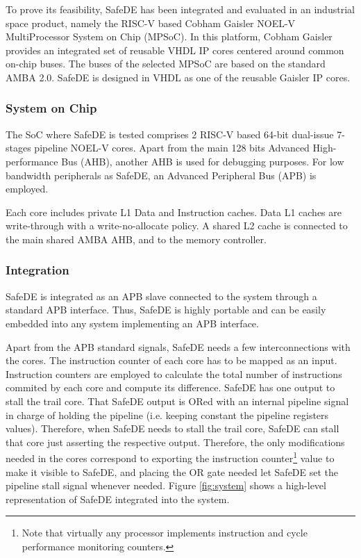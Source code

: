 To prove its feasibility, SafeDE has been integrated and evaluated in an industrial space product, namely the RISC-V based Cobham Gaisler NOEL-V MultiProcessor System on Chip (MPSoC). In this platform, Cobham Gaisler provides an integrated set of reusable VHDL IP cores centered around common on-chip buses. The buses of the selected MPSoC are based on the standard AMBA 2.0. SafeDE is designed in VHDL as one of the reusable Gaisler IP cores. 

\subsubsection{System on Chip}
The SoC where SafeDE is tested comprises 2 RISC-V based 64-bit dual-issue 7-stages pipeline NOEL-V cores. Apart from the main 128 bits Advanced High-performance Bus (AHB), another AHB is used for debugging purposes. For low bandwidth peripherals as SafeDE, an Advanced Peripheral Bus (APB) is employed.

Each core includes private L1 Data and Instruction caches. Data L1 caches are write-through with a write-no-allocate policy. A shared L2 cache is connected to the main shared AMBA AHB, and to the memory controller. 


\subsubsection{Integration}
SafeDE is integrated as an APB slave connected to the system through a standard APB interface. Thus, SafeDE is highly portable and can be easily embedded into any system implementing an APB interface.

Apart from the APB standard signals, SafeDE needs a few interconnections with the cores. The instruction counter of each core has to be mapped as an input. Instruction counters are employed to calculate the total number of instructions commited by each core and compute its difference. SafeDE has one output to stall the trail core. That SafeDE output is ORed with an internal pipeline signal in charge of holding the pipeline (i.e. keeping constant the pipeline registers values). Therefore, when SafeDE needs to stall the trail core, SafeDE can stall that core just asserting the respective output. 
Therefore, the only modifications needed in the cores correspond to exporting the instruction counter\footnote{Note that virtually any processor implements instruction and cycle performance monitoring counters.} value to make it visible to SafeDE, and placing the OR gate needed let SafeDE set the pipeline stall signal whenever needed.
Figure \ref{fig:system} shows a high-level representation of SafeDE integrated into the system.


